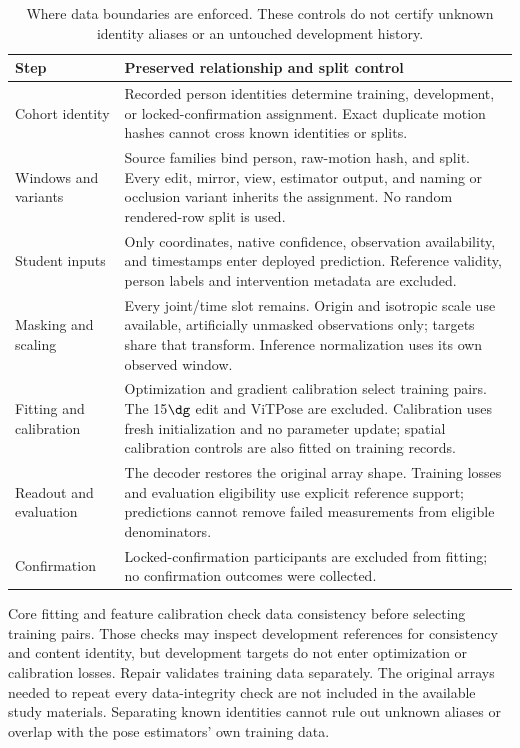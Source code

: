 \begin{table}[h]\centering\small
\caption{Where data boundaries are enforced. These controls do not certify unknown identity aliases or an untouched development history.}
\begin{tabular}{>{\raggedright\arraybackslash}p{1.0in}>{\raggedright\arraybackslash}p{3.95in}}\toprule
Step & Preserved relationship and split control \\\midrule
Cohort identity & Recorded person identities determine training, development, or locked-confirmation assignment. Exact duplicate motion hashes cannot cross known identities or splits. \\
Windows and variants & Source families bind person, raw-motion hash, and split. Every edit, mirror, view, estimator output, and naming or occlusion variant inherits the assignment. No random rendered-row split is used. \\
Student inputs & Only coordinates, native confidence, observation availability, and timestamps enter deployed prediction. Reference validity, person labels and intervention metadata are excluded. \\
Masking and scaling & Every joint/time slot remains. Origin and isotropic scale use available, artificially unmasked observations only; targets share that transform. Inference normalization uses its own observed window. \\
Fitting and calibration & Optimization and gradient calibration select training pairs. The 15$\dg$ edit and ViTPose are excluded. Calibration uses fresh initialization and no parameter update; spatial calibration controls are also fitted on training records. \\
Readout and evaluation & The decoder restores the original array shape. Training losses and evaluation eligibility use explicit reference support; predictions cannot remove failed measurements from eligible denominators. \\
Confirmation & Locked-confirmation participants are excluded from fitting; no confirmation outcomes were collected. \\\bottomrule
\end{tabular}
\end{table}

Core fitting and feature calibration check data consistency before selecting training pairs. Those checks may inspect development references for consistency and content identity, but development targets do not enter optimization or calibration losses. Repair validates training data separately. The original arrays needed to repeat every data-integrity check are not included in the available study materials. Separating known identities cannot rule out unknown aliases or overlap with the pose estimators' own training data.

